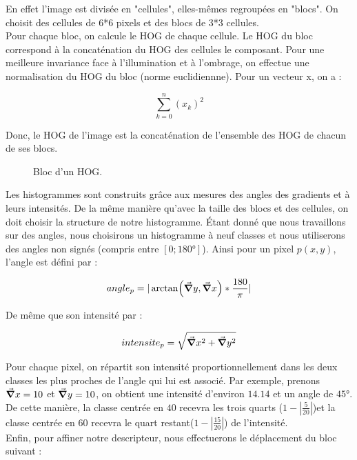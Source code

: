 En effet l'image est divisée en "cellules", elles-mêmes regroupées en "blocs". On choisit des cellules de 6*6 pixels et des blocs de 3*3 cellules.\\

Pour chaque bloc, on calcule le HOG de chaque cellule. Le HOG du bloc correspond à la concaténation du HOG des cellules le composant. Pour une meilleure invariance face à l'illumination et à l'ombrage, on effectue une normalisation du HOG du bloc (norme euclidiennne). Pour un vecteur x, on a :

\[ \sum_{k=0}^{n} (x_{k})^{2} \]

Donc, le HOG de l'image est la concaténation de l'ensemble des HOG de chacun de ses blocs.

\begin{figure}[!htbp]
\center
\caption{Bloc d'un HOG.}
\label{fig:cuttlefish_bloccells}
\end{figure}
\FloatBarrier

Les histogrammes sont construits grâce aux mesures des angles des gradients et à leurs intensités. De la même manière qu'avec la taille des blocs et des cellules, on doit choisir la structure de notre histogramme. Étant donné que nous travaillons sur des angles, nous choisirons un histogramme à neuf classes et nous utiliserons des angles non signés (compris entre $[0; 180°]$).
Ainsi pour un pixel $p(x,y)$, l'angle est défini par :

\[ angle_{p} = |\arctan (\grad y, \grad x)*\frac{180}{\pi}| \]

De même que son intensité par :

\[ intensite_{p} = \sqrt{\grad x^{2} + \grad y^{2}} \]

Pour chaque pixel, on répartit son intensité proportionnellement dans les deux classes les plus proches de l'angle qui lui est associé. 
Par exemple, prenons $\grad x = 10$ et $\grad y = 10$, on obtient une intensité d'environ $14.14$ et un angle de $45°$. De cette manière, la classe centrée en $40$ recevra les trois quarts ($1 - |\frac{5}{20}|$)et la classe centrée en $60$ recevra le quart restant($1 - |\frac{15}{20}|$) de l'intensité.\\


Enfin, pour affiner notre descripteur, nous effectuerons le déplacement du bloc suivant :

